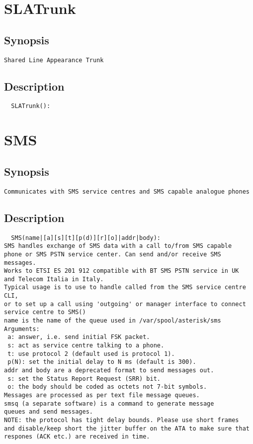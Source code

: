 \section{SLATrunk}
\subsection{Synopsis}
\begin{verbatim}
Shared Line Appearance Trunk
\end{verbatim}
\subsection{Description}
\begin{verbatim}
  SLATrunk():

\end{verbatim}


\section{SMS}
\subsection{Synopsis}
\begin{verbatim}
Communicates with SMS service centres and SMS capable analogue phones
\end{verbatim}
\subsection{Description}
\begin{verbatim}
  SMS(name|[a][s][t][p(d)][r][o]|addr|body):
SMS handles exchange of SMS data with a call to/from SMS capable
phone or SMS PSTN service center. Can send and/or receive SMS messages.
Works to ETSI ES 201 912 compatible with BT SMS PSTN service in UK
and Telecom Italia in Italy.
Typical usage is to use to handle called from the SMS service centre CLI,
or to set up a call using 'outgoing' or manager interface to connect
service centre to SMS()
name is the name of the queue used in /var/spool/asterisk/sms
Arguments:
 a: answer, i.e. send initial FSK packet.
 s: act as service centre talking to a phone.
 t: use protocol 2 (default used is protocol 1).
 p(N): set the initial delay to N ms (default is 300).
addr and body are a deprecated format to send messages out.
 s: set the Status Report Request (SRR) bit.
 o: the body should be coded as octets not 7-bit symbols.
Messages are processed as per text file message queues.
smsq (a separate software) is a command to generate message
queues and send messages.
NOTE: the protocol has tight delay bounds. Please use short frames
and disable/keep short the jitter buffer on the ATA to make sure that
respones (ACK etc.) are received in time.

\end{verbatim}


